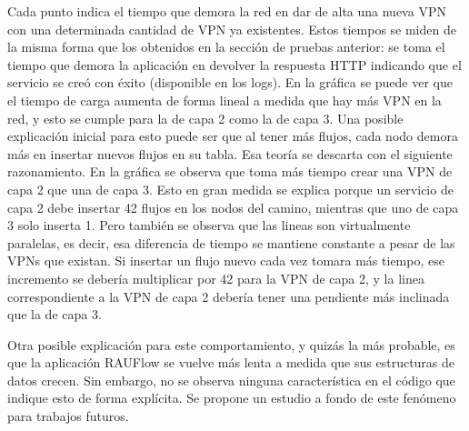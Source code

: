 Cada punto indica el tiempo que demora la red en dar de alta una nueva VPN con una determinada cantidad de VPN ya existentes. Estos tiempos se miden de la misma forma que los obtenidos en la sección de pruebas anterior: se toma el tiempo que demora la aplicación en devolver la respuesta HTTP indicando que el servicio se creó con éxito (disponible en los logs). En la gráfica se puede ver que el tiempo de carga aumenta de forma lineal a medida que hay más VPN en la red, y esto se cumple para la de capa 2 como la de capa 3. Una posible explicación inicial para esto puede ser que al tener más flujos, cada nodo demora más en insertar nuevos flujos en su tabla. Esa teoría se descarta con el siguiente razonamiento. En la gráfica se observa que toma más tiempo crear una VPN de capa 2 que una de capa 3. Esto en gran medida se explica porque un servicio de capa 2 debe insertar 42 flujos en los nodos del camino, mientras que uno de capa 3 solo inserta 1. Pero también se observa que las lineas son virtualmente paralelas, es decir, esa diferencia de tiempo se mantiene constante a pesar de las VPNs que existan. Si insertar un flujo nuevo cada vez tomara más tiempo, ese incremento se debería multiplicar por 42 para la VPN de capa 2, y la linea correspondiente a la VPN de capa 2 debería tener una pendiente más inclinada que la de capa 3.

Otra posible explicación para este comportamiento, y quizás la más probable, es que la aplicación RAUFlow se vuelve más lenta a medida que sus estructuras de datos crecen. Sin embargo, no se observa ninguna característica en el código que indique esto de forma explícita. Se propone un estudio a fondo de este fenómeno para trabajos futuros.

